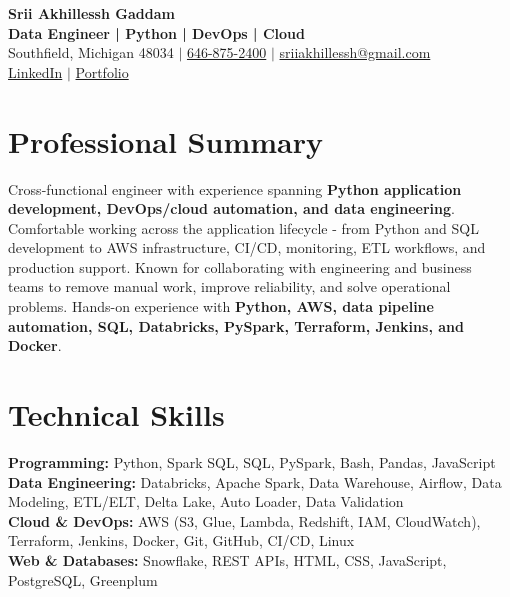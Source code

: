 \documentclass[letterpaper,10pt]{article}
\begin{document}
\fontsize{9.35pt}{10.45pt}\selectfont

\begin{center}
    {\LARGE \textbf{Srii Akhillessh Gaddam}} \\[-1pt]
    \textbf{Data Engineer | Python | DevOps | Cloud} \\[2pt]
    Southfield, Michigan 48034 $|$
    \href{tel:6468752400}{646-875-2400} $|$
    \href{mailto:sriiakhillessh@gmail.com}{sriiakhillessh@gmail.com} \\[1pt]
    \href{https://www.linkedin.com/in/srii-akhiilessh-gaddam-b48668191/}{LinkedIn} $|$
    \href{https://sriiakhillesshg.github.io/portfolio/}{Portfolio}
\end{center}
\vspace{-8pt}

\section{Professional Summary}
\small{Cross-functional engineer with experience spanning \textbf{Python application development, DevOps/cloud automation, and data engineering}. Comfortable working across the application lifecycle - from Python and SQL development to AWS infrastructure, CI/CD, monitoring, ETL workflows, and production support. Known for collaborating with engineering and business teams to remove manual work, improve reliability, and solve operational problems. Hands-on experience with \textbf{Python, AWS, data pipeline automation, SQL, Databricks, PySpark, Terraform, Jenkins, and Docker}.}

\section{Technical Skills}
\small{
\textbf{Programming:} Python, Spark SQL, SQL, PySpark, Bash, Pandas, JavaScript \\
\textbf{Data Engineering:} Databricks, Apache Spark, Data Warehouse, Airflow, Data Modeling, ETL/ELT, Delta Lake, Auto Loader, Data Validation \\
\textbf{Cloud \& DevOps:} AWS (S3, Glue, Lambda, Redshift, IAM, CloudWatch), Terraform, Jenkins, Docker, Git, GitHub, CI/CD, Linux \\
\textbf{Web \& Databases:} Snowflake, REST APIs, HTML, CSS, JavaScript, PostgreSQL, Greenplum
}
\end{document}
